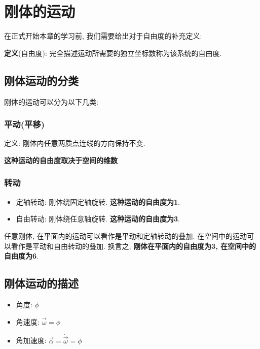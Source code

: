 \documentclass[
  a4paper,
]{ctexrep}
\providecommand{\tightlist}{%
  \setlength{\itemsep}{0pt}\setlength{\parskip}{0pt}}
\begin{document}
\section{刚体的运动}\label{ux521aux4f53ux7684ux8fd0ux52a8}

在正式开始本章的学习前, 我们需要给出对于自由度的补充定义:

\textbf{定义}(自由度): 完全描述运动所需要的独立坐标数称为该系统的自由度.

\subsection{刚体运动的分类}\label{ux521aux4f53ux8fd0ux52a8ux7684ux5206ux7c7b}

刚体的运动可以分为以下几类:

\subsubsection{平动(平移)}\label{ux5e73ux52a8ux5e73ux79fb}

定义: 刚体内任意两质点连线的方向保持不变.

\textbf{这种运动的自由度取决于空间的维数}

\subsubsection{转动}\label{ux8f6cux52a8}

\begin{itemize}
\tightlist
\item
  定轴转动: 刚体绕固定轴旋转. \textbf{这种运动的自由度为1}.
\item
  自由转动: 刚体绕任意轴旋转. \textbf{这种运动的自由度为3}.
\end{itemize}

任意刚体, 在平面内的运动可以看作是平动和定轴转动的叠加.
在空间中的运动可以看作是平动和自由转动的叠加. 换言之,
\textbf{刚体在平面内的自由度为3, 在空间中的自由度为6}.

\subsection{刚体运动的描述}\label{ux521aux4f53ux8fd0ux52a8ux7684ux63cfux8ff0}

\begin{itemize}
\tightlist
\item
  角度: \(\phi\)
\item
  角速度: \(\vec{\omega} = \dot{\phi}\)
\item
  角加速度: \(\vec{\alpha} = \dot{\vec{\omega}} = \ddot{\phi}\)
\end{itemize}
\end{document}
